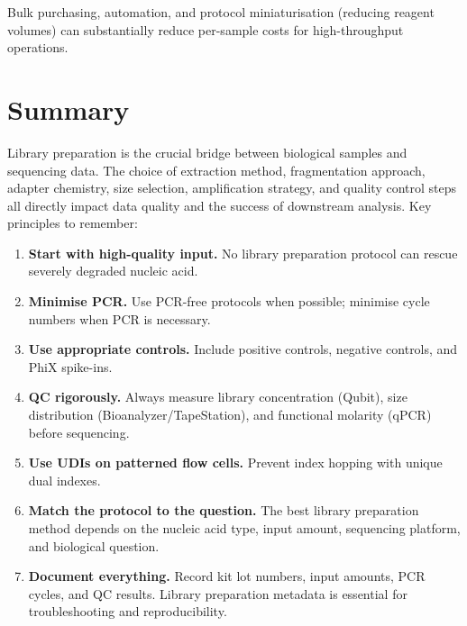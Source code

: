 Bulk purchasing, automation, and protocol miniaturisation (reducing reagent volumes) can substantially reduce per-sample costs for high-throughput operations.


\section{Summary}

Library preparation is the crucial bridge between biological samples and sequencing data. The choice of extraction method, fragmentation approach, adapter chemistry, size selection, amplification strategy, and quality control steps all directly impact data quality and the success of downstream analysis. Key principles to remember:

\begin{enumerate}[nosep]
  \item \textbf{Start with high-quality input.} No library preparation protocol can rescue severely degraded nucleic acid.
  \item \textbf{Minimise PCR.} Use PCR-free protocols when possible; minimise cycle numbers when PCR is necessary.
  \item \textbf{Use appropriate controls.} Include positive controls, negative controls, and PhiX spike-ins.
  \item \textbf{QC rigorously.} Always measure library concentration (Qubit), size distribution (Bioanalyzer/TapeStation), and functional molarity (qPCR) before sequencing.
  \item \textbf{Use UDIs on patterned flow cells.} Prevent index hopping with unique dual indexes.
  \item \textbf{Match the protocol to the question.} The best library preparation method depends on the nucleic acid type, input amount, sequencing platform, and biological question.
  \item \textbf{Document everything.} Record kit lot numbers, input amounts, PCR cycles, and QC results. Library preparation metadata is essential for troubleshooting and reproducibility.
\end{enumerate}
